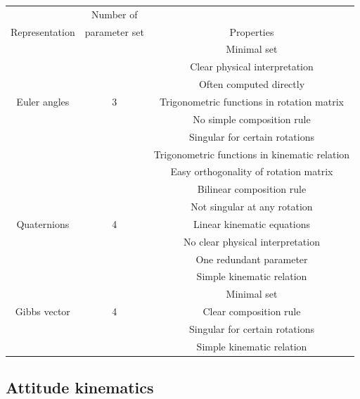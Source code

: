 \label{tab:attRepSelection}
\begin{center}
 \begin{tabular}{||c || c | c ||}
 \hline
 &Number of  &  \\ [0.5ex] 
Representation &parameter set & Properties \\ [0.5ex] 
 \hline\hline
& & Minimal set\\ 
& & Clear physical interpretation\\ 
& & Often computed directly\\ 
 Euler angles   & 3 & Trigonometric functions in rotation matrix \\ 
& & No simple composition rule \\ 
& & Singular for certain rotations \\ 
& & Trigonometric functions in kinematic relation \\ 
 \hline
& & Easy orthogonality of rotation matrix\\ 
& & Bilinear composition rule\\ 
& & Not singular at any rotation\\ 
Quaternions   & 4 & Linear kinematic equations \\ 
& & No clear physical interpretation \\ 
& &One redundant parameter \\ 
& & Simple kinematic relation \\ 
 \hline
& & Minimal set\\ 
Gibbs vector   & 4 & Clear composition rule\\ 
& & Singular for certain rotations \\ 
& & Simple kinematic relation \\[1ex] 
 \hline
\end{tabular}
\end{center}



\subsection{Attitude kinematics}

